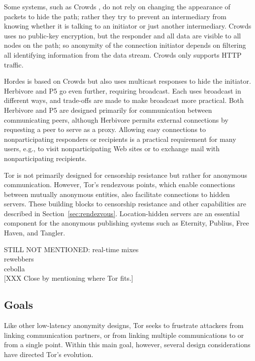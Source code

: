 \documentclass[times,10pt,twocolumn]{article}
\begin{document}
Some systems, such as Crowds \cite{crowds-tissec}, do not rely on changing the
appearance of packets to hide the path; rather they try to prevent an
intermediary from knowing whether it is talking to an initiator
or just another intermediary.  Crowds uses no public-key
encryption, but the responder and all data are visible to all
nodes on the path; so anonymity of the connection initiator depends on
filtering all identifying information from the data stream. Crowds only
supports HTTP traffic.

Hordes \cite{hordes-jcs} is based on Crowds but also uses multicast
responses to hide the initiator. Herbivore \cite{herbivore} and
P5 \cite{p5} go even further, requiring broadcast.
Each uses broadcast in different ways, and trade-offs are made to
make broadcast more practical. Both Herbivore and P5 are designed primarily
for communication between communicating peers, although Herbivore
permits external connections by requesting a peer to serve as a proxy.
Allowing easy connections to nonparticipating responders or recipients
is a practical requirement for many users, e.g., to visit
nonparticipating Web sites or to exchange mail with nonparticipating
recipients.

Tor is not primarily designed for censorship resistance but rather
for anonymous communication. However, Tor's rendezvous points, which
enable connections between mutually anonymous entities, also
facilitate connections to hidden servers.  These building blocks to
censorship resistance and other capabilities are described in
Section~\ref{sec:rendezvous}.  Location-hidden servers are an
essential component for the anonymous publishing systems such as
Eternity\cite{eternity}, Publius\cite{publius},
Free Haven\cite{freehaven-berk}, and Tangler\cite{tangler}.


STILL NOT MENTIONED:
real-time mixes\\
rewebbers\\
cebolla\\


[XXX Close by mentioning where Tor fits.]

\label{sec:assumptions}

\subsection{Goals}
Like other low-latency anonymity designs, Tor seeks to frustrate
attackers from linking communication partners, or from linking
multiple communications to or from a single point.  Within this
main goal, however, several design considerations have directed
Tor's evolution.
\end{document}
